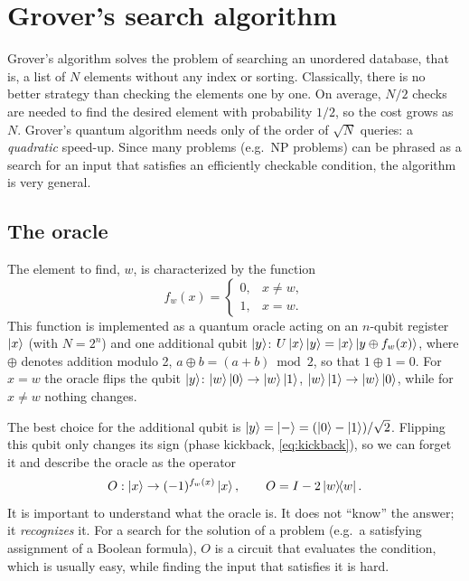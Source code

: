 \chapter{Grover's search algorithm}\label{ch:grover}

Grover's algorithm \cite{Grover1996} solves the problem of searching an unordered database, that is, a list of $N$ elements without any index or sorting. Classically, there is no better strategy than
checking the elements one by one. On average, $N/2$ checks are needed to find the desired element with probability $1/2$, so the cost grows as $N$. Grover's quantum algorithm needs only of the order of
$\sqrt N$ queries: a \emph{quadratic} speed-up. Since many problems (e.g.\ NP problems) can be phrased as a search for an input that satisfies an efficiently checkable condition, the algorithm is very general.

\section{The oracle}
The element to find, $w$, is characterized by the function
\begin{equation}
  f_w(x)=\begin{cases}0,&x\neq w,\\1,&x=w.\end{cases}
\end{equation}
This function is implemented as a quantum oracle acting on an $n$-qubit register $\left|x\right\rangle$ (with $N=2^n$) and one additional qubit $\left|y\right\rangle$: $U\left|x\right\rangle\left|y\right\rangle=\left|x\right\rangle\left|y\oplus f_w(x)\right\rangle$, where $\oplus$ denotes
addition modulo 2, $a\oplus b=(a+b)\bmod2$, so that $1\oplus1=0$. For $x=w$ the oracle flips the qubit $\left|y\right\rangle$: $\left|w\right\rangle\left|0\right\rangle\to\left|w\right\rangle\left|1\right\rangle$, $\left|w\right\rangle\left|1\right\rangle\to\left|w\right\rangle\left|0\right\rangle$, while for $x\neq w$ nothing changes.

The best choice for the additional qubit is $\left|y\right\rangle=\left|-\right\rangle=(\left|0\right\rangle-\left|1\right\rangle)/\sqrt2$. Flipping this qubit only changes its sign (phase kickback, \cref{eq:kickback}), so we can forget it and describe the oracle as the operator
\begin{equation}
  O:\left|x\right\rangle\to(-1)^{f_w(x)}\left|x\right\rangle,\qquad O=I-2\left|w\middle\rangle\!\middle\langle w\right| .
\end{equation}
It is important to understand what the oracle is. It does not ``know'' the answer; it \emph{recognizes} it. For a search for the solution of a problem (e.g.\ a satisfying assignment of a Boolean formula),
$O$ is a circuit that evaluates the condition, which is usually easy, while finding the input that satisfies it is hard.

